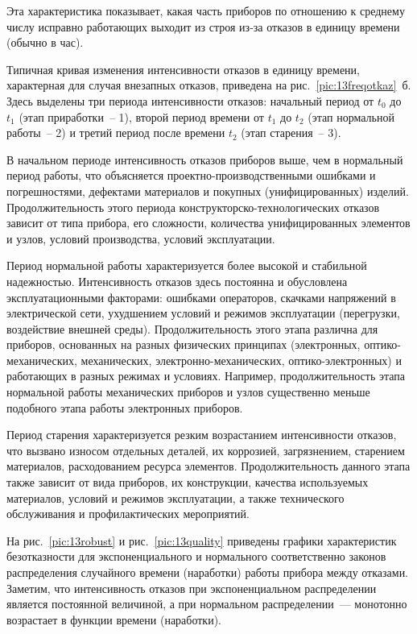 Эта характеристика показывает, какая часть приборов по отношению к среднему числу исправно работающих выходит из строя из-за отказов в единицу времени (обычно в час).

Типичная кривая изменения интенсивности отказов в единицу времени, характерная для случая внезапных отказов, приведена на рис.~\ref{pic:13freqotkaz}~б. Здесь выделены три периода интенсивности отказов: начальный период от $ t_0 $ до $ t_1 $ (этап приработки~-- 1), второй период времени от $ t_1 $ до $ t_2 $ (этап нормальной работы~-- 2) и третий период после времени $ t_2 $ (этап старения~-- 3).

В начальном периоде интенсивность отказов приборов выше, чем в нормальный период работы, что объясняется проектно-производственными ошибками и погрешностями, дефектами материалов и покупных (унифицированных) изделий. Продолжительность этого периода конструкторско-технологических отказов зависит от типа прибора, его сложности, количества унифицированных элементов и узлов, условий производства, условий эксплуатации.

Период нормальной работы характеризуется более высокой и стабильной надежностью. Интенсивность отказов здесь постоянна и обусловлена эксплуатационными факторами: ошибками операторов, скачками напряжений в электрической сети, ухудшением условий и режимов эксплуатации (перегрузки, воздействие внешней среды). Продолжительность этого этапа различна для приборов, основанных на разных физических принципах (электронных, оптико-механических, механических, электронно-механических, оптико-электронных) и работающих в разных режимах и условиях. Например, продолжительность этапа нормальной работы механических приборов и узлов существенно меньше подобного этапа работы электронных приборов.

Период старения характеризуется резким возрастанием интенсивности отказов, что вызвано износом отдельных деталей, их коррозией, загрязнением, старением материалов, расходованием ресурса элементов. Продолжительность данного этапа также зависит от вида приборов, их конструкции, качества используемых материалов, условий и режимов эксплуатации, а также технического обслуживания и профилактических мероприятий.

На рис.~\ref{pic:13robust} и рис.~\ref{pic:13quality} приведены графики характеристик безотказности для экспоненциального и нормального соответственно законов распределения случайного времени (наработки) работы прибора между отказами. Заметим, что интенсивность отказов при экспоненциальном распределении является постоянной величиной, а при нормальном распределении~--- монотонно возрастает в функции времени (наработки).

